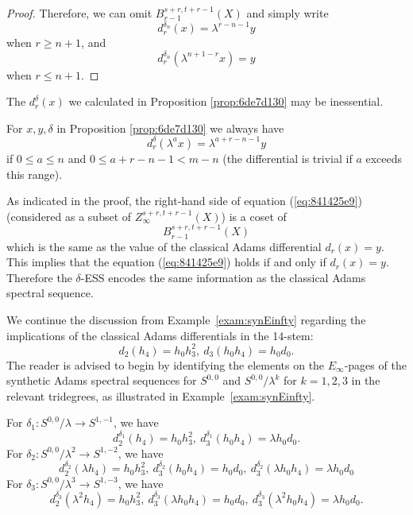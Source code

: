 \documentclass{amsart}
\numberwithin{equation}{section}
\begin{document}
\begin{proof}
    Therefore, we can omit $B_{r-1}^{s+r,t+r-1}(X)$ and simply write
    $$d^{\delta_n}_r(x)= \lambda^{r-n-1}y$$
    when $r\ge n+1$, and
    $$d^{\delta_n}_r(\lambda^{n+1-r}x)= y$$
    when $r\le n+1$.
\end{proof}

\begin{remark}
    The $d^{\delta}_r(x)$ we calculated in Proposition \ref{prop:6de7d130} may be inessential.
\end{remark}


\begin{corollary}\label{cor:2a636737}
    For $x,y,\delta$ in Proposition \ref{prop:6de7d130} we always have
    \begin{equation}\label{eq:841425e9}
        d^{\delta}_r(\lambda^ax)=\lambda^{a+r-n-1}y
    \end{equation}
    if $0\le a\le n$ and $0\le a+r-n-1<m-n$ (the differential is trivial if $a$ exceeds this range).
\end{corollary}

\begin{remark}\label{rmk:qvoewfj}
    As indicated in the proof, the right-hand side of equation (\ref{eq:841425e9}) (considered as a subset of $Z_\infty^{s+r,t+r-1}(X)$) is a coset of
    $$B_{r-1}^{s+r,t+r-1}(X)$$
    which is the same as the value of the classical Adams differential $d_r(x)=y$. This implies that the equation (\ref{eq:841425e9}) holds if and only if $d_r(x)=y$. Therefore the $\delta$-ESS encodes the same information as the classical Adams spectral sequence.
\end{remark}

\begin{example}
    We continue the discussion from Example~\ref{exam:synEinfty} regarding the implications of the classical Adams differentials in the 14-stem:
    $$d_2(h_4) = h_0h_3^2, \ d_3(h_0h_4) = h_0d_0.$$
    The reader is advised to begin by identifying the elements on the $E_\infty$-pages of the synthetic Adams spectral sequences for $S^{0,0}$ and $S^{0,0}/\lambda^k$ for $k=1,2,3$ in the relevant tridegrees, as illustrated in Example~\ref{exam:synEinfty}.
    
    For $\delta_1: S^{0,0}/\lambda \rightarrow S^{1,-1}$, we have
    $$d_2^{\delta_1}(h_4) = h_0h_3^2, \ d_3^{\delta_1}(h_0h_4) = \lambda h_0d_0.$$
    For $\delta_2: S^{0,0}/\lambda^2 \rightarrow S^{1,-2}$, we have
    $$d_2^{\delta_2}(\lambda h_4) = h_0h_3^2, \ d_3^{\delta_2}(h_0h_4) = h_0d_0, \ d_3^{\delta_2}(\lambda h_0h_4) = \lambda h_0d_0$$
    For $\delta_3: S^{0,0}/\lambda^3 \rightarrow S^{1,-3}$, we have
    $$d_2^{\delta_3}(\lambda^2 h_4) = h_0h_3^2, \ d_3^{\delta_3}(\lambda h_0h_4) = h_0d_0, \ d_3^{\delta_3}(\lambda^2 h_0h_4) =\lambda h_0d_0.$$
\end{example}
\end{document}
